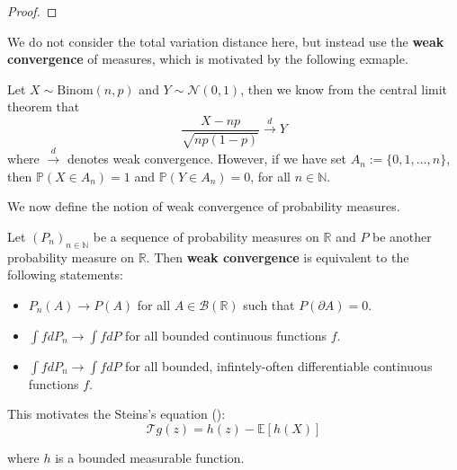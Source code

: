 \documentclass{article}
\begin{document}
\begin{proof}
    
\end{proof}

We do not consider the total variation distance here, but instead use the \textbf{weak convergence} of measures, which is motivated by the following exmaple.  

\begin{example}

    Let $X\sim \mathrm{Binom}(n,p)$ and $Y\sim \mathcal{N}(0,1)$, then we know from the central limit theorem that
    \begin{equation*}
        \frac{X-np}{\sqrt{np(1-p)}} \xrightarrow{d} Y
    \end{equation*}
    where $\xrightarrow{d}$ denotes weak convergence. However, if we have set $A_n :=\{0, 1, \ldots, n\}$, then $\mathbb{P}(X\in A_n) = 1$ and $\mathbb{P}(Y\in A_n) = 0$, for all $n\in \mathbb{N}$.
\end{example}

We now define the notion of weak convergence of probability measures.  

\begin{definition}
   Let $(P_n)_{n\in \mathbb{N}}$ be a sequence of probability measures on $\mathbb{R}$ and $P$ be another probability measure on $\mathbb{R}$. Then \textbf{weak convergence} is equivalent to the following statements:
   \begin{itemize}
    \item $P_n(A) \to P(A)$ for all $A \in \mathcal{B}(\mathbb{R})$ such that $P(\partial A)=0$.
    \item $\int f dP_n \to \int f dP$ for all bounded continuous functions $f$.
    \item $\int f dP_n \to \int f dP$ for all bounded, infintely-often differentiable continuous functions $f$.
   \end{itemize}
\end{definition}

This motivates the Steins's equation ():
\begin{equation}\label{eq:stein_equation_normal}
    \mathcal{T}g(z) = h(z) - \mathbb{E}[h(X)]
\end{equation}

where $h$ is a bounded measurable function.
\end{document}
